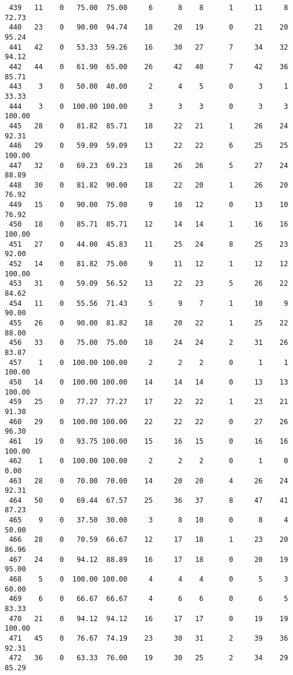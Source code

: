 \begin{verbatim}
 439   11    0   75.00  75.00     6      8    8      1     11     8    72.73
 440   23    0   90.00  94.74    18     20   19      0     21    20    95.24
 441   42    0   53.33  59.26    16     30   27      7     34    32    94.12
 442   44    0   61.90  65.00    26     42   40      7     42    36    85.71
 443    3    0   50.00  40.00     2      4    5      0      3     1    33.33
 444    3    0  100.00 100.00     3      3    3      0      3     3   100.00
 445   28    0   81.82  85.71    18     22   21      1     26    24    92.31
 446   29    0   59.09  59.09    13     22   22      6     25    25   100.00
 447   32    0   69.23  69.23    18     26   26      5     27    24    88.89
 448   30    0   81.82  90.00    18     22   20      1     26    20    76.92
 449   15    0   90.00  75.00     9     10   12      0     13    10    76.92
 450   18    0   85.71  85.71    12     14   14      1     16    16   100.00
 451   27    0   44.00  45.83    11     25   24      8     25    23    92.00
 452   14    0   81.82  75.00     9     11   12      1     12    12   100.00
 453   31    0   59.09  56.52    13     22   23      5     26    22    84.62
 454   11    0   55.56  71.43     5      9    7      1     10     9    90.00
 455   26    0   90.00  81.82    18     20   22      1     25    22    88.00
 456   33    0   75.00  75.00    18     24   24      2     31    26    83.87
 457    1    0  100.00 100.00     2      2    2      0      1     1   100.00
 458   14    0  100.00 100.00    14     14   14      0     13    13   100.00
 459   25    0   77.27  77.27    17     22   22      1     23    21    91.30
 460   29    0  100.00 100.00    22     22   22      0     27    26    96.30
 461   19    0   93.75 100.00    15     16   15      0     16    16   100.00
 462    1    0  100.00 100.00     2      2    2      0      1     0     0.00
 463   28    0   70.00  70.00    14     20   20      4     26    24    92.31
 464   50    0   69.44  67.57    25     36   37      8     47    41    87.23
 465    9    0   37.50  30.00     3      8   10      0      8     4    50.00
 466   28    0   70.59  66.67    12     17   18      1     23    20    86.96
 467   24    0   94.12  88.89    16     17   18      0     20    19    95.00
 468    5    0  100.00 100.00     4      4    4      0      5     3    60.00
 469    6    0   66.67  66.67     4      6    6      0      6     5    83.33
 470   21    0   94.12  94.12    16     17   17      0     19    19   100.00
 471   45    0   76.67  74.19    23     30   31      2     39    36    92.31
 472   36    0   63.33  76.00    19     30   25      2     34    29    85.29

\end{verbatim}
